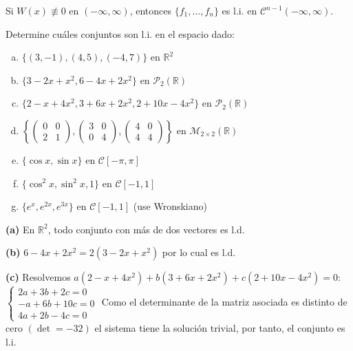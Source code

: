 \begin{theorem}
Si $W(x) \not\equiv 0$ en $(-\infty, \infty)$, entonces $\{f_1,\dots,f_n\}$ es l.i. en $\mathcal{C}^{n-1}(-\infty, \infty)$.
\end{theorem}

\begin{prob} Determine cuáles conjuntos son l.i. en el espacio dado:
\begin{enumerate}[(a)]
\item $\{(3,-1), (4,5), (-4,7)\}$ en $\mathbb{R}^2$
\item $\{3-2x+x^2, 6-4x+2x^2\}$ en $\mathcal{P}_2(\mathbb{R})$
\item $\{2-x+4x^2, 3+6x+2x^2, 2+10x-4x^2\}$ en $\mathcal{P}_2(\mathbb{R})$
\item $\left\{ \begin{pmatrix} 0 & 0 \\ 2 & 1 \end{pmatrix}, \begin{pmatrix} 3 & 0 \\ 0 & 4 \end{pmatrix}, \begin{pmatrix} 4 & 0 \\ 4 & 4 \end{pmatrix} \right\}$ en $\mathcal{M}_{2\times 2}(\mathbb{R})$
\item $\{\cos x, \sin x\}$ en $\mathcal{C}[-\pi, \pi]$
\item $\{\cos^2 x, \sin^2 x, 1\}$ en $\mathcal{C}[-1, 1]$
\item $\{e^x, e^{2x}, e^{3x}\}$ en $\mathcal{C}[-1, 1]$ (use Wronskiano)
\end{enumerate}

\begin{myproof}
\textbf{(a)} En $\mathbb{R}^2$, todo conjunto con más de dos vectores es l.d.

\textbf{(b)} $6-4x+2x^2 = 2(3-2x+x^2)$ por lo cual es l.d. 

\textbf{(c)} Resolvemos $a(2-x+4x^2) + b(3+6x+2x^2) + c(2+10x-4x^2) = 0$: $\begin{cases} 2a + 3b + 2c = 0 \\ -a + 6b + 10c = 0 \\ 4a + 2b - 4c = 0 \end{cases}$ Como el determinante de la matriz asociada es distinto de cero $(\det = -32 )$ el sistema tiene la solución trivial, por tanto, el conjunto es l.i.


\end{myproof}
\end{prob}
